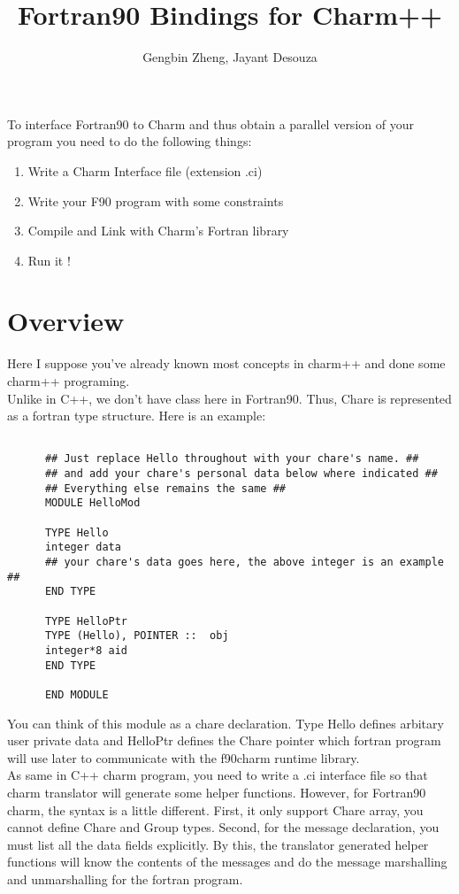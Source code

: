\documentclass[11pt]{article}
\title{Fortran90 Bindings for Charm++}
\author{Gengbin Zheng, Jayant Desouza}
\begin{document}
\maketitle

To interface Fortran90 to Charm and thus obtain a parallel version of
your program you need to do the following things:
\begin{enumerate}
\item Write a Charm Interface file (extension .ci)
\item Write your F90 program with some constraints
\item Compile and Link with Charm's Fortran library
\item Run it !
\end{enumerate}

\section{Overview}

Here I suppose you've already known most concepts in charm++ and done some 
charm++ programing.  \\
Unlike in C++, we don't have class here in Fortran90. Thus, Chare is 
represented as a fortran type structure. Here is an example:

\begin{verbatim}

      ## Just replace Hello throughout with your chare's name. ##
      ## and add your chare's personal data below where indicated ##
      ## Everything else remains the same ##
      MODULE HelloMod

      TYPE Hello
      integer data
      ## your chare's data goes here, the above integer is an example ##
      END TYPE

      TYPE HelloPtr
      TYPE (Hello), POINTER ::  obj
      integer*8 aid
      END TYPE

      END MODULE
\end{verbatim}
You can think of this module as a chare declaration. Type Hello defines 
arbitary user private data and HelloPtr defines the Chare pointer which 
fortran program will use later to communicate with the f90charm runtime 
library. \\
As same in C++ charm program, you need to write a .ci interface file
so that charm translator will generate some helper functions. However, for
Fortran90 charm, the syntax is a little different. First, it only support
Chare array, you cannot define Chare and Group types. Second, for the 
message declaration, you must list all the data fields explicitly.
By this, the translator generated helper functions will know the contents
of the messages and do the message marshalling and unmarshalling for 
the fortran program. 
\end{document}
